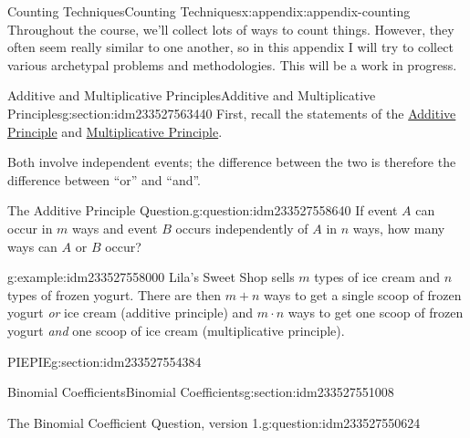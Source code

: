 \documentclass[oneside,10pt,]{book}
\numberwithin{equation}{section}
\begin{document}
\begin{appendixptx}{Counting Techniques}{}{Counting Techniques}{}{}{x:appendix:appendix-counting}
Throughout the course, we'll collect lots of ways to count things. However, they often seem really similar to one another, so in this appendix I will try to collect various archetypal problems and methodologies. This will be a work in progress.%
%
%
\typeout{************************************************}
\typeout{************************************************}
%
\begin{sectionptx}{Additive and Multiplicative Principles}{}{Additive and Multiplicative Principles}{}{}{g:section:idm233527563440}
First, recall the statements of the \hyperref[x:assemblage:additive-principle]{Additive Principle} and \hyperref[x:assemblage:multiplicative-principle]{Multiplicative Principle}.%
\par
Both involve independent events; the difference between the two is therefore the difference between ``or'' and ``and''.%
\begin{question}{The Additive Principle Question.}{g:question:idm233527558640}%
If event \(A\) can occur in \(m\) ways and event \(B\) occurs independently of \(A\) in \(n\) ways, how many ways can \(A\) or \(B\) occur?%
\end{question}
\begin{example}{}{g:example:idm233527558000}%
Lila's Sweet Shop sells \(m\) types of ice cream and \(n\) types of frozen yogurt. There are then \(m+n\) ways to get a single scoop of frozen yogurt \emph{or} ice cream (additive principle) and \(m\cdot n\) ways to get one scoop of frozen yogurt \emph{and} one scoop of ice cream (multiplicative principle).%
\end{example}
\end{sectionptx}
%
%
\typeout{************************************************}
\typeout{************************************************}
%
\begin{sectionptx}{PIE}{}{PIE}{}{}{g:section:idm233527554384}
\end{sectionptx}
%
%
\typeout{************************************************}
\typeout{************************************************}
%
\begin{sectionptx}{Binomial Coefficients}{}{Binomial Coefficients}{}{}{g:section:idm233527551008}
\begin{question}{The Binomial Coefficient Question, version 1.}{g:question:idm233527550624}%

\end{question}
\end{sectionptx}
\end{appendixptx}
\end{document}
